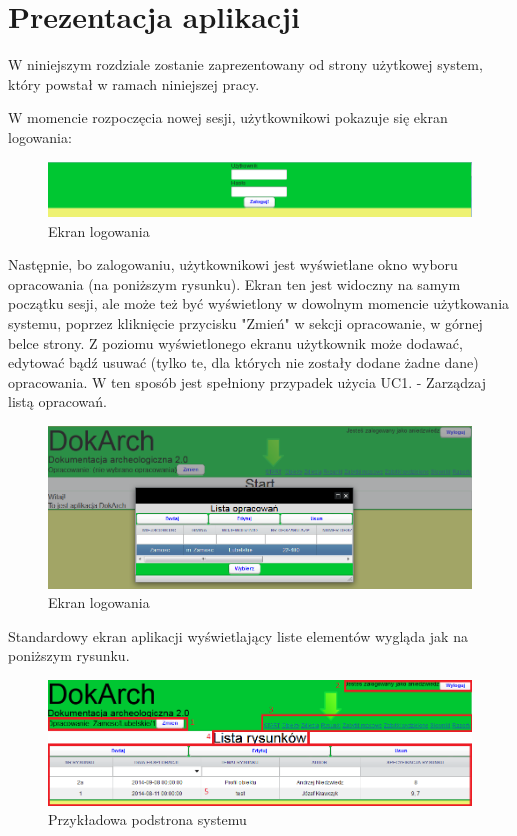 \chapter{Prezentacja aplikacji}
W niniejszym rozdziale zostanie zaprezentowany od strony użytkowej system, który powstał w ramach niniejszej pracy.

W momencie rozpoczęcia nowej sesji, użytkownikowi pokazuje się ekran logowania:

\begin{figure} [H]
    \begin{center}
	\includegraphics[scale=.6]{img/ekranLogowania.png}
	\caption{Ekran logowania}
	\label{stronaPrzyklad}
    \end{center}
\end{figure}

Następnie, bo zalogowaniu, użytkownikowi jest wyświetlane okno wyboru opracowania (na poniższym rysunku). Ekran ten jest widoczny na samym początku sesji, ale może też być wyświetlony w dowolnym momencie użytkowania systemu, poprzez kliknięcie przycisku "Zmień" w sekcji opracowanie, w górnej belce strony. Z poziomu wyświetlonego ekranu użytkownik może dodawać, edytować bądź usuwać (tylko te, dla których nie zostały dodane żadne dane) opracowania. W ten sposób jest spełniony przypadek użycia UC1. - Zarządzaj listą opracowań.
\begin{figure} [H]
    \begin{center}
	\includegraphics[scale=.6]{img/ekranStartowy.png}
	\caption{Ekran logowania}
	\label{stronaPrzyklad}
    \end{center}
\end{figure}
\newpage
Standardowy ekran aplikacji wyświetlający liste elementów wygląda jak na poniższym rysunku.

\begin{figure} [H]
    \begin{center}
	\includegraphics[scale=.6]{img/strona.png}
	\caption{Przykładowa podstrona systemu}
	\label{stronaPrzyklad}
    \end{center}
\end{figure}

